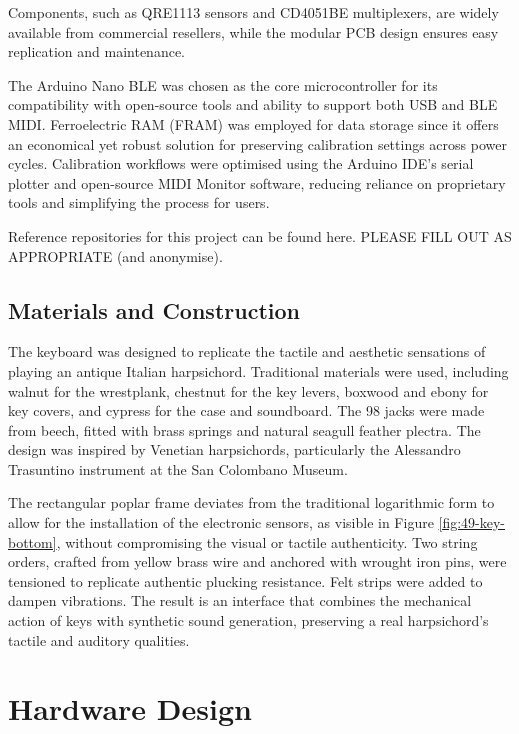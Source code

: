 Components, such as QRE1113 sensors and CD4051BE multiplexers, are widely available from commercial resellers, while the modular PCB design ensures easy replication and maintenance.

The Arduino Nano BLE was chosen as the core microcontroller for its compatibility with open-source tools and ability to support both USB and BLE MIDI. Ferroelectric RAM (FRAM) was employed for data storage since it offers an economical yet robust solution for preserving calibration settings across power cycles. Calibration workflows were optimised using the Arduino IDE’s serial plotter and open-source MIDI Monitor software, reducing reliance on proprietary tools and simplifying the process for users. 

Reference repositories for this project can be found here. PLEASE FILL OUT AS APPROPRIATE (and anonymise).

\subsection{Materials and Construction}

The keyboard was designed to replicate the tactile and aesthetic sensations of playing an antique Italian harpsichord. Traditional materials were used, including walnut for the wrestplank, chestnut for the key levers, boxwood and ebony for key covers, and cypress for the case and soundboard. The 98 jacks were made from beech, fitted with brass springs and natural seagull feather plectra. The design was inspired by Venetian harpsichords, particularly the Alessandro Trasuntino instrument at the San Colombano Museum. 

The rectangular poplar frame deviates from the traditional logarithmic form to allow for the installation of the electronic sensors, as visible in Figure \ref{fig:49-key-bottom}, without compromising the visual or tactile authenticity. Two string orders, crafted from yellow brass wire and anchored with wrought iron pins, were tensioned to replicate authentic plucking resistance. Felt strips were added to dampen vibrations. The result is an interface that combines the mechanical action of keys with synthetic sound generation, preserving a real harpsichord's tactile and auditory qualities.


\section{Hardware Design}\label{hardware-design}

